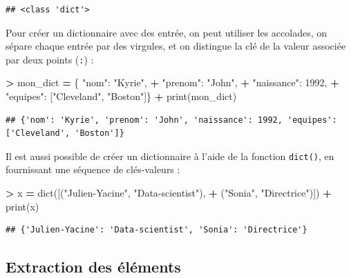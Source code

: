 \documentclass[12pt,]{book}
\newenvironment{Shaded}{\begin{snugshade}}{\end{snugshade}}
\newcommand{\DecValTok}[1]{\textcolor[rgb]{0.00,0.00,0.81}{#1}}
\newcommand{\StringTok}[1]{\textcolor[rgb]{0.31,0.60,0.02}{#1}}
\newcommand{\OperatorTok}[1]{\textcolor[rgb]{0.81,0.36,0.00}{\textbf{#1}}}
\newcommand{\BuiltInTok}[1]{#1}
\newcommand{\NormalTok}[1]{#1}
\numberwithin{equation}{section}
\numberwithin{countremarque}{section}
\begin{document}
\begin{lstlisting}
## <class 'dict'>
\end{lstlisting}

Pour créer un dictionnaire avec des entrée, on peut utiliser les
accolades, on sépare chaque entrée par des virgules, et on distingue la
clé de la valeur associée par deux points (\texttt{:}) :

\begin{Shaded}
\begin{Highlighting}[]
\OperatorTok{>}\NormalTok{ mon_dict }\OperatorTok{=}\NormalTok{ \{ }\StringTok{"nom"}\NormalTok{: }\StringTok{"Kyrie"}\NormalTok{,}
\OperatorTok{+}   \StringTok{"prenom"}\NormalTok{: }\StringTok{"John"}\NormalTok{,}
\OperatorTok{+}   \StringTok{"naissance"}\NormalTok{: }\DecValTok{1992}\NormalTok{,}
\OperatorTok{+}   \StringTok{"equipes"}\NormalTok{: [}\StringTok{"Cleveland"}\NormalTok{, }\StringTok{"Boston"}\NormalTok{]\}}
\OperatorTok{+} \BuiltInTok{print}\NormalTok{(mon_dict)}
\end{Highlighting}
\end{Shaded}

\begin{lstlisting}
## {'nom': 'Kyrie', 'prenom': 'John', 'naissance': 1992, 'equipes': ['Cleveland', 'Boston']}
\end{lstlisting}

Il est aussi possible de créer un dictionnaire à l'aide de la fonction
\texttt{dict()}, en fournissant une séquence de clés-valeurs :

\begin{Shaded}
\begin{Highlighting}[]
\OperatorTok{>}\NormalTok{ x }\OperatorTok{=} \BuiltInTok{dict}\NormalTok{([(}\StringTok{"Julien-Yacine"}\NormalTok{, }\StringTok{"Data-scientist"}\NormalTok{),}
\OperatorTok{+}\NormalTok{   (}\StringTok{"Sonia"}\NormalTok{, }\StringTok{"Directrice"}\NormalTok{)])}
\OperatorTok{+} \BuiltInTok{print}\NormalTok{(x)}
\end{Highlighting}
\end{Shaded}

\begin{lstlisting}
## {'Julien-Yacine': 'Data-scientist', 'Sonia': 'Directrice'}
\end{lstlisting}

\subsection{Extraction des éléments}\label{extraction-des-elements-1}
\end{document}
